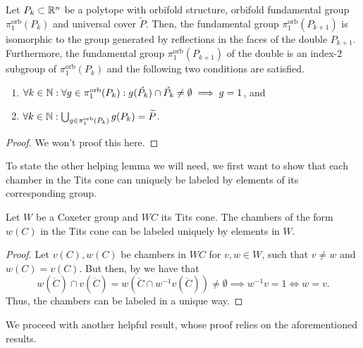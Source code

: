 \begin{proposition}\label{prop:double}
    Let \(P_k \subset \mathbb{R}^n\) be a polytope with orbifold structure, orbifold fundamental group \(\pi_1^{\text{orb}}(P_k)\) and universal cover \(\widetilde{P}\).
    Then, the fundamental group \(\pi_1^{\text{orb}}(P_{k+1})\) is isomorphic to the group generated by reflections in the faces of the double \(P_{k+1}\).
    Furthermore, the fundamental group \(\pi_1^{\text{orb}}(P_{k+1})\) of the double is an index-\(2\) subgroup of \(\pi_1^{\text{orb}}(P_k)\) and the following two conditions are satisfied.
    \begin{enumerate}
        \item \(\forall k \in \mathbb{N}: \forall g \in \pi_1^{\text{orb}}(P_k): g(\mathring{P_k}) \cap \mathring{P_k} \neq \emptyset \implies g = 1\), and
        \item \(\forall k \in \mathbb{N}: \bigcup_{g \in \pi_1^{\text{orb}}(P_k)} g(P_{k}) = \widetilde{P}\).
    \end{enumerate}
\end{proposition}
\begin{proof}
    We won't proof this here.
\end{proof}

To state the other helping lemma we will need, we first want to show that each chamber in the Tits cone can uniquely be labeled by elements of its corresponding group.

\begin{lemma}\label{lem:labels}
    Let \(W\) be a Coxeter group and \(WC\) its Tits cone.
    The chambers of the form \(w(C)\) in the Tits cone can be labeled uniquely by elements in \(W\).
\end{lemma}
\begin{proof}
    Let \(v(C), w(C)\) be chambers in \(WC\) for \(v, w \in W\), such that \(v \neq w\) and \(w(C) = v(C)\).\newline
    But then, by  we have that
    \[w(\mathring{C}) \cap v(\mathring{C}) = w(\mathring{C} \cap w^{-1}v(\mathring{C})) \neq \emptyset \implies w^{-1}v = 1 \iff w = v.\]
    Thus, the chambers can be labeled in a unique way.
\end{proof}

We proceed with another helpful result, whose proof relies on the aforementioned results.

